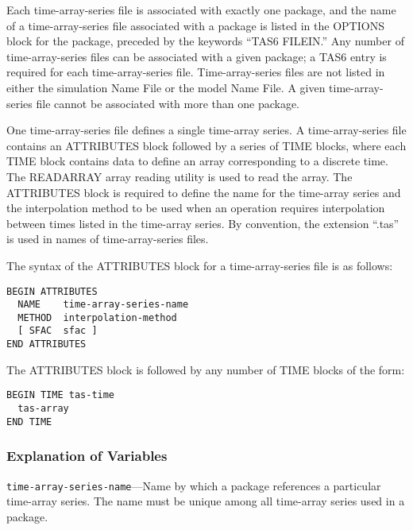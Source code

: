 Each time-array-series file is associated with exactly one package, and the name of a time-array-series file associated with a package is listed in the OPTIONS block for the package, preceded by the keywords ``TAS6 FILEIN.'' Any number of time-array-series files can be associated with a given package; a TAS6 entry is required for each time-array-series file. Time-array-series files are not listed in either the simulation Name File or the model Name File. A given time-array-series file cannot be associated with more than one package.

One time-array-series file defines a single time-array series. A time-array-series file contains an ATTRIBUTES block followed by a series of TIME blocks, where each TIME block contains data to define an array corresponding to a discrete time. The READARRAY array reading utility is used to read the array. The ATTRIBUTES block is required to define the name for the time-array series and the interpolation method to be used when an operation requires interpolation between times listed in the time-array series.  By convention, the extension ``.tas'' is used in names of time-array-series files.

The syntax of the ATTRIBUTES block for a time-array-series file is as follows:

\begin{lstlisting}[style=blockdefinition]
BEGIN ATTRIBUTES
  NAME    time-array-series-name
  METHOD  interpolation-method
  [ SFAC  sfac ]
END ATTRIBUTES
\end{lstlisting}

The ATTRIBUTES block is followed by any number of TIME blocks of the form:\\
\begin{lstlisting}[style=blockdefinition]
BEGIN TIME tas-time  
  tas-array
END TIME
\end{lstlisting}

\subsubsection{Explanation of Variables}

\begin{description}
\item \texttt{time-array-series-name}---Name by which a package references a particular time-array series. The name must be unique among all time-array series used in a package.
\end{description}

